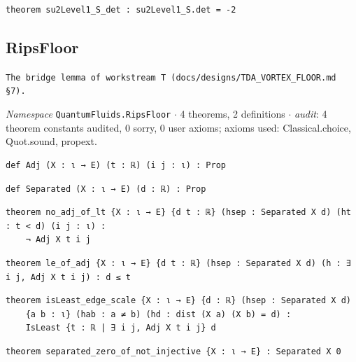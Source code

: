 \begin{lstlisting}[style=leancat]
theorem su2Level1_S_det : su2Level1_S.det = -2
\end{lstlisting}

\subsection{RipsFloor}\label{appA:RipsFloor}
{\footnotesize\raggedright\texttt{The bridge lemma of workstream T (docs/\allowbreak{}designs/\allowbreak{}TDA\_\allowbreak{}VORTEX\_\allowbreak{}FLOOR.\allowbreak{}md §7).\allowbreak{}}\par}
{\footnotesize\raggedright\emph{Namespace} \texttt{QuantumFluids.\allowbreak{}RipsFloor} $\cdot$ 4 theorems, 2 definitions $\cdot$ \emph{audit}: 4 theorem constants audited, 0 sorry, 0 user axioms; axioms used: Classical.choice, Quot.sound, propext.\par}
\vspace{1pt}
\begin{lstlisting}[style=leancat]
def Adj (X : ι → E) (t : ℝ) (i j : ι) : Prop
\end{lstlisting}

\begin{lstlisting}[style=leancat]
def Separated (X : ι → E) (d : ℝ) : Prop
\end{lstlisting}

\begin{lstlisting}[style=leancat]
theorem no_adj_of_lt {X : ι → E} {d t : ℝ} (hsep : Separated X d) (ht : t < d) (i j : ι) :
    ¬ Adj X t i j
\end{lstlisting}

\begin{lstlisting}[style=leancat]
theorem le_of_adj {X : ι → E} {d t : ℝ} (hsep : Separated X d) (h : ∃ i j, Adj X t i j) : d ≤ t
\end{lstlisting}

\begin{lstlisting}[style=leancat]
theorem isLeast_edge_scale {X : ι → E} {d : ℝ} (hsep : Separated X d)
    {a b : ι} (hab : a ≠ b) (hd : dist (X a) (X b) = d) :
    IsLeast {t : ℝ | ∃ i j, Adj X t i j} d
\end{lstlisting}

\begin{lstlisting}[style=leancat]
theorem separated_zero_of_not_injective {X : ι → E} : Separated X 0
\end{lstlisting}

